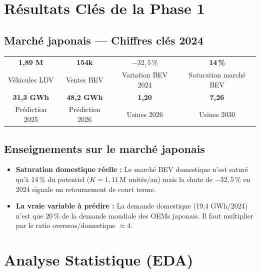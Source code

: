 \documentclass[12pt,a4paper]{article}
\begin{document}
\section{Résultats Clés de la Phase 1}

\subsection{Marché japonais --- Chiffres clés 2024}

\begin{table}[H]
\centering
\begin{tabular}{cccc}
\toprule
\textbf{1,89 M} & \textbf{154k} & \textbf{$-32{,}5\,\%$} & \textbf{14\,\%} \\
Véhicules LDV & Ventes BEV & Variation BEV 2024 & Saturation marché BEV \\
\midrule
\textbf{31,3 GWh} & \textbf{48,2 GWh} & \textbf{1,20} & \textbf{7,26} \\
Prédiction 2025 & Prédiction 2026 & Usines 2026 & Usines 2030 \\
\bottomrule
\end{tabular}
\end{table}

\subsection{Enseignements sur le marché japonais}

\begin{itemize}
  \item \textbf{Saturation domestique réelle :} Le marché BEV domestique n'est saturé qu'à
        14\,\% du potentiel ($K = 1{,}11$\,M unités/an) mais la chute de $-32{,}5\,\%$ en 2024
        signale un retournement de court terme.

  \item \textbf{La vraie variable à prédire :} La demande domestique (19,4 GWh/2024)
        n'est que 20\,\% de la demande mondiale des OEMs japonais. Il faut multiplier par le
        ratio overseas/domestique $\approx 4$.
\end{itemize}

\section{Analyse Statistique (EDA)}
\end{document}
